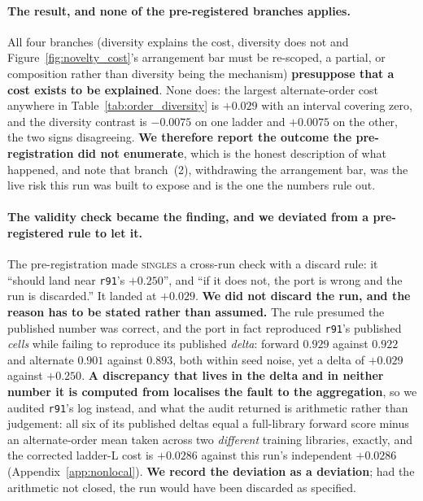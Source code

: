 \paragraph{The result, and none of the pre-registered branches applies.} All four branches (diversity explains the cost, diversity does not and Figure~\ref{fig:novelty_cost}'s arrangement bar must be re-scoped, a partial, or composition rather than diversity being the mechanism) \textbf{presuppose that a cost exists to be explained}. None does: the largest alternate-order cost anywhere in Table~\ref{tab:order_diversity} is $+0.029$ with an interval covering zero, and the diversity contrast is $-0.0075$ on one ladder and $+0.0075$ on the other, the two signs disagreeing. \textbf{We therefore report the outcome the pre-registration did not enumerate}, which is the honest description of what happened, and note that branch~(2), withdrawing the arrangement bar, was the live risk this run was built to expose and is the one the numbers rule out.

\paragraph{The validity check became the finding, and we deviated from a pre-registered rule to let it.} The pre-registration made \textsc{singles} a cross-run check with a discard rule: it ``should land near \texttt{r91}'s $+0.250$'', and ``if it does not, the port is wrong and the run is discarded.'' It landed at $+0.029$. \textbf{We did not discard the run, and the reason has to be stated rather than assumed.} The rule presumed the published number was correct, and the port in fact reproduced \texttt{r91}'s published \emph{cells} while failing to reproduce its published \emph{delta}: forward $0.929$ against $0.922$ and alternate $0.901$ against $0.893$, both within seed noise, yet a delta of $+0.029$ against $+0.250$. \textbf{A discrepancy that lives in the delta and in neither number it is computed from localises the fault to the aggregation}, so we audited \texttt{r91}'s log instead, and what the audit returned is arithmetic rather than judgement: all six of its published deltas equal a full-library forward score minus an alternate-order mean taken across two \emph{different} training libraries, exactly, and the corrected ladder-L cost is $+0.0286$ against this run's independent $+0.0286$ (Appendix~\ref{app:nonlocal}). \textbf{We record the deviation as a deviation}; had the arithmetic not closed, the run would have been discarded as specified.

